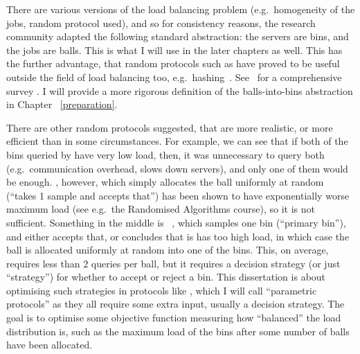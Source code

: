 There are various versions of the load balancing problem (e.g.\ homogeneity of the jobs, random protocol used), and so for consistency reasons, the research community adapted the following standard abstraction: the servers are bins, and the jobs are balls. This is what I will use in the later chapters as well. This has the further advantage, that random protocols such as \TwoChoice have proved to be useful outside the field of load balancing too, e.g.\ hashing~\cite{azar1999twochoice}. See~\cite{udi2017ballsintobinslandscape} for a comprehensive survey . I will provide a more rigorous definition of the balls-into-bins abstraction in Chapter ~\ref{preparation}.


There are other random protocols suggested, that are more realistic, or more efficient than \TwoChoice in some circumstances. For example, we can see that if both of the bins queried by \TwoChoice have very low load, then, it was unnecessary to query both (e.g.\ communication overhead, slows down servers), and only one of them would be enough. \OneChoice, however, which simply allocates the ball uniformly at random (``takes 1 sample and accepts that'') has been shown to have exponentially worse maximum load  (see e.g.\ the Randomised Algorithms course), so it is not sufficient. Something in the middle is \TwoThinning~\cite{feldheim2021thinning}, which samples one bin (``primary bin''), and either accepts that, or concludes that is has too high load, in which case the ball is allocated uniformly at random into one of the bins. This, on average, requires less than $2$ queries per ball, but it requires a decision strategy (or just ``strategy'') for whether to accept or reject a bin. This dissertation is about optimising such strategies in protocols like \TwoThinning, which I will call ``parametric protocols'' as they all require some extra input, usually a decision strategy. The goal is to optimise some objective function measuring how ``balanced'' the load distribution is, such as the maximum load of the bins after some number of balls have been allocated.



